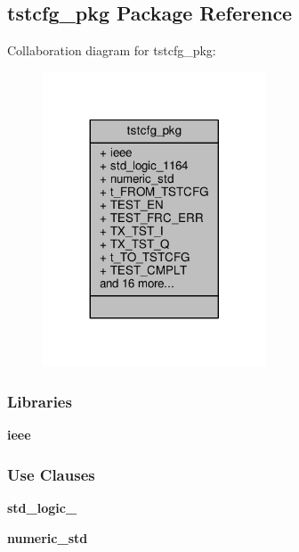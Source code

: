 \subsection{tstcfg\+\_\+pkg Package Reference}
\label{clasststcfg__pkg}


Collaboration diagram for tstcfg\+\_\+pkg\+:\nopagebreak
\begin{figure}[H]
\begin{center}
\leavevmode
\includegraphics[width=188pt]{d2/ded/clasststcfg__pkg__coll__graph}
\end{center}
\end{figure}
\subsubsection*{Libraries}
 \begin{DoxyCompactItemize}
\item 
{\bf ieee} 
\end{DoxyCompactItemize}
\subsubsection*{Use Clauses}
 \begin{DoxyCompactItemize}
\item 
{\bf std\+\_\+logic\+\_}   
\item 
{\bf numeric\+\_\+std}   
\end{DoxyCompactItemize}
